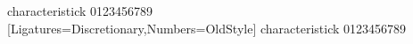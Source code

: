 \documentclass{standalone}
\begin{document}
\fontsize{14}{16}\selectfont
\begin{minipage}{3in}
characteristick 0123456789\\
[Ligatures=Discretionary,Numbers=OldStyle]
characteristick 0123456789
\end{minipage}
\end{document}

